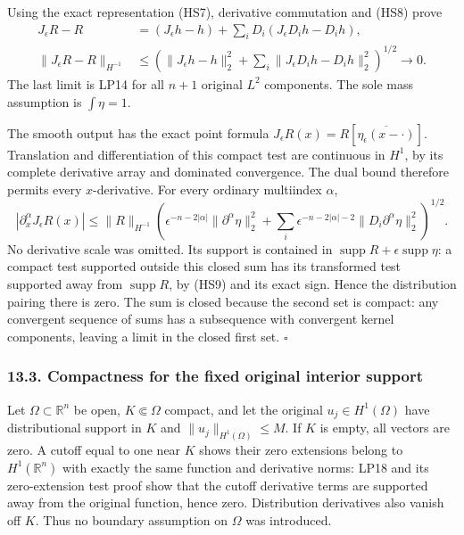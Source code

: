 \documentclass[
  11pt,
]{article}
\begin{document}
Using the exact representation (HS7), derivative commutation and (HS8)
prove \[
 \begin{split}
 J_\epsilon R-R
  &=(J_\epsilon h-h)
           +\sum_iD_i(J_\epsilon D_i h-D_i h),\\
 \|J_\epsilon R-R\|_{H^{-1}}
  &\leq\left(\|J_\epsilon h-h\|_2^2
              +\sum_i\|J_\epsilon D_i h-D_i h\|_2^2\right)^{1/2}
       \longrightarrow0.                                    
 \end{split} \tag{HS11}
\] The last limit is LP14 for all \(n+1\) original \(L^2\) components.
The sole mass assumption is \(\int\eta=1\).

The smooth output has the exact point formula
\(J_\epsilon R(x)=R[\overline{\eta_\epsilon(x-\cdot)}]\). Translation
and differentiation of this compact test are continuous in \(H^1\), by
its complete derivative array and dominated convergence. The dual bound
therefore permits every \(x\)-derivative. For every ordinary multiindex
\(\alpha\), \[
 |\partial_x^\alpha J_\epsilon R(x)|
 \leq\|R\|_{H^{-1}}
 \left(\epsilon^{-n-2|\alpha|}\|\partial^\alpha\eta\|_2^2
       +\sum_i\epsilon^{-n-2|\alpha|-2}
                     \|D_i\partial^\alpha\eta\|_2^2\right)^{1/2}.
                                                               \tag{HS12}
\] No derivative scale was omitted. Its support is contained in
\(\operatorname{supp}R+\epsilon\operatorname{supp}\eta\): a compact test
supported outside this closed sum has its transformed test supported
away from \(\operatorname{supp}R\), by (HS9) and its exact sign. Hence
the distribution pairing there is zero. The sum is closed because the
second set is compact: any convergent sequence of sums has a subsequence
with convergent kernel components, leaving a limit in the closed first
set. \(\square\)

\subsubsection{13.3. Compactness for the fixed original interior
support}\label{compactness-for-the-fixed-original-interior-support}

Let \(\Omega\subset\mathbb R^n\) be open, \(K\Subset\Omega\) compact,
and let the original \(u_j\in H^1(\Omega)\) have distributional support
in \(K\) and \(\|u_j\|_{H^1(\Omega)}\leq M\). If \(K\) is empty, all
vectors are zero. A cutoff equal to one near \(K\) shows their zero
extensions belong to \(H^1(\mathbb R^n)\) with exactly the same function
and derivative norms: LP18 and its zero-extension test proof show that
the cutoff derivative terms are supported away from the original
function, hence zero. Distribution derivatives also vanish off \(K\).
Thus no boundary assumption on \(\Omega\) was introduced.
\end{document}
